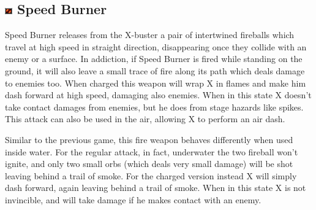 \subsection{\includegraphics[width=12px, height=10px]{figures/X2/weapons/S_burner.png} Speed Burner}\label{Speed_burner}
Speed Burner releases from the X-buster a pair of intertwined fireballs which travel at high speed in straight direction, disappearing once they collide with an enemy or a surface. In addiction, if Speed Burner is fired while standing on the ground, it will also leave a small trace of fire along its path which deals damage to enemies too. When charged this weapon will wrap X in flames and make him dash forward at high speed, damaging also enemies. When in this state X doesn't take contact damages from enemies, but he does from stage hazards like spikes. This attack can also be used in the air, allowing X to perform an air dash.

Similar to the previous game, this fire weapon behaves differently when used inside water. For the regular attack, in fact, underwater the two fireball won't ignite, and only two small orbs (which deals very small damage) will be shot leaving behind a trail of smoke. For the charged version instead X will simply dash forward, again leaving behind a trail of smoke. When in this state X is not invincible, and will take damage if he makes contact with an enemy.

